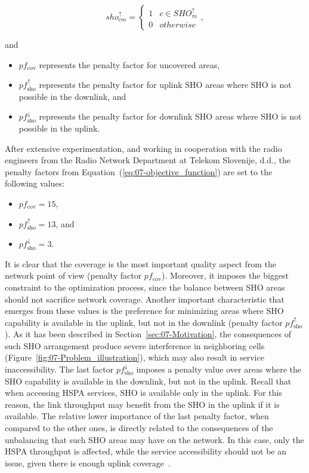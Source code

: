 \begin{equation}
sho_{cm}^{\uparrow}=\begin{cases}
1 & c\in SHO_{m}^{\uparrow}\\
0 & otherwise
\end{cases},
\end{equation}


\noindent and
\begin{itemize}
\item $pf_{\mathrm{cov}}$ represents the penalty factor for uncovered areas,
\item $pf_{\mathrm{sho}}^{\uparrow}$ represents the penalty factor for
uplink SHO areas where SHO is not possible in the downlink, and
\item $pf_{\mathrm{sho}}^{\downarrow}$ represents the penalty factor for
downlink SHO areas where SHO is not possible in the uplink.
\end{itemize}
\bigskip{}


After extensive experimentation, and working in cooperation with the
radio engineers from the Radio Network Department at Telekom Slovenije,
d.d., the penalty factors from Equation~(\ref{eq:07-objective_function})
are set to the following values:
\begin{itemize}
\item $pf_{\mathrm{cov}}=15$,
\item $pf_{\mathrm{sho}}^{\uparrow}=13$, and
\item $pf_{\mathrm{sho}}^{\downarrow}=3$.
\end{itemize}
It is clear that the coverage is the most important quality aspect
from the network point of view (penalty factor $pf_{\mathrm{cov}}$).
Moreover, it imposes the biggest constraint to the optimization process,
since the balance between SHO areas should not sacrifice network coverage.
Another important characteristic that emerges from these values is
the preference for minimizing areas where SHO capability is available
in the uplink, but not in the downlink (penalty factor $pf_{\mathrm{sho}}^{\uparrow}$).
As it has been described in Section~\ref{sec:07-Motivation}, the
consequences of such SHO arrangement produce severe interference in
neighboring cells (Figure~\ref{fig:07-Problem_illustration}), which
may also result in service inaccessibility. The last factor $pf_{\mathrm{sho}}^{\downarrow}$
imposes a penalty value over areas where the SHO capability is available
in the downlink, but not in the uplink. Recall that when accessing
HSPA services, SHO is available only in the uplink. For this reason,
the link throughput may benefit from the SHO in the uplink if it is
available. The relative lower importance of the last penalty factor,
when compared to the other ones, is directly related to the consequences
of the unbalancing that such SHO areas may have on the network. In
this case, only the HSPA throughput is affected, while the service
accessibility should not be an issue, given there is enough uplink
coverage~\cite{holma2006hsdpa}.


